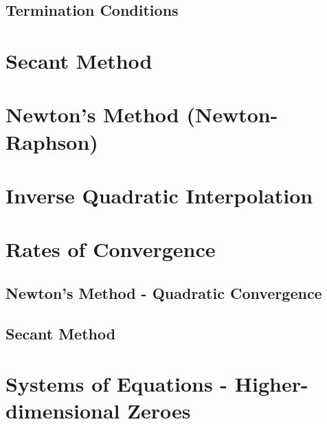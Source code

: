     \subsection{Termination Conditions}
    
    \section{Secant Method}
    
    \section{Newton's Method (Newton-Raphson)}
    
    \section{Inverse Quadratic Interpolation}
    
    \section{Rates of Convergence}
    
    \subsection{Newton's Method - Quadratic Convergence}
    
    \subsection{Secant Method}
    
    \section{Systems of Equations - Higher-dimensional Zeroes}
